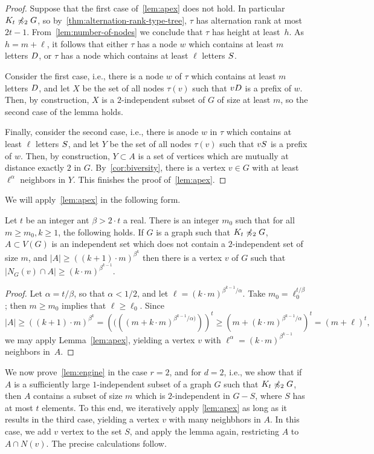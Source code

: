 \begin{proof}
Suppose that the first case of~\cref{lem:apex} does not hold. In particular $K_t\not\preccurlyeq_2 G$, so by~\cref{thm:alternation-rank-type-tree}, $\tau$ has alternation rank at most $2t-1$. From~\cref{lem:number-of-nodes} 
we conclude that $\tau$  has height at least~$h$.
As $h=m+\ell$, it follows that either $\tau$  has a node $w$ which contains at least $m$ letters $D$, or $\tau$ has a node which contains  at least $\ell$ letters $S$.

Consider the first case, i.e., there is a node $w$ of $\tau$
which contains at least $m$ letters $D$, and let $X$
be the set of all nodes $\tau(v)$ such that $vD$ is a prefix of $w$. Then, by construction, $X$ is a $2$-independent subset of $G$ of size at least $m$, so the second case of the lemma holds.

Finally, consider the second case, i.e., there is anode $w$ in $\tau$ which contains at least $\ell$ letters $S$, and let 
$Y$ be the set of all nodes $\tau(v)$ such that $vS$ is a prefix of $w$. Then, by construction, $Y\subset A$ is a set of vertices which are mutually at distance exactly $2$ in $G$. By~\cref{cor:biversity}, there is a vertex $v\in G$
with at least $\ell^{\alpha}$ neighbors in $Y$.
This finishes the proof of~\cref{lem:apex}.
\end{proof}

We will apply~\cref{lem:apex} in the following form.
\begin{corollary}\label{cor:apex}
	Let $t$ be an integer ant $\beta>2\cdot t$ a real. 
	There is an integer $m_0$ such that for all $m\ge m_0,k\ge 1$, the following holds.
	If $G$ is a graph such that $K_t\not\preccurlyeq_2 G$,
	$A\subset V(G)$ is an independent set which does not contain a $2$-independent set of size $m$, and $|A|\ge ((k+1)\cdot m)^{\beta ^k}$
	then there is a vertex $v$ of $G$ such that $|N_G(v)\cap A| \ge (k\cdot m)^{\beta^{k-1}}$.
\end{corollary}
\begin{proof}
Let $\alpha=t/\beta$, so that $\alpha<1/2$, 
 and let 
$\ell=(k\cdot m)^{\beta^{k-1}/\alpha}$.
Take $m_0= \ell_0^{t/\beta}$; then $m\ge m_0$ implies that $\ell\ge\ell_0$.
Since
$$|A|\ge \left((k+1)\cdot m\right)^{\beta^k}=\left ((((m+ k\cdot m)^{\beta^{k-1}/\alpha)}) \right)^t
\ge (m+(k\cdot m)^{\beta^{k-1}/\alpha})^t=(m+\ell)^t,$$
we may  apply Lemma~\ref{lem:apex},
yielding a vertex $v$ with $\ell^\alpha=(k\cdot m)^{\beta^{k-1}}$ neighbors in~$A$.
\end{proof}

We now prove~\cref{lem:engine} in the case $r=2$, and for $d=2$, i.e., we show  that if $A$ is a sufficiently large $1$-independent subset of a graph $G$ such that $K_t\not\preccurlyeq_2 G$, then $A$ contains a subset of size $m$
which is  $2$-independent in  $G-S$, where $S$ has at most $t$ elements. 
To this end, we iteratively apply \cref{lem:apex} as long as  it results in the third case, yielding a vertex $v$ with many neighbhors in $A$. In this case, we add $v$ vertex to the set $S$, and apply the lemma again,
restricting $A$ to $A\cap N(v)$. 
The precise calculations follow.


